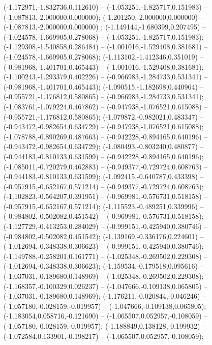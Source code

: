  (-1.172971,-1.832736,0.112610) -- (-1.053251,-1.825717,0.151983) -- (-1.087813,-2.000000,0.000000);
 (-1.201250,-2.000000,0.000000) -- (-1.087813,-2.000000,0.000000) ;
 (-1.149144,-1.680399,0.207495) -- (-1.024578,-1.669905,0.278068) -- (-1.053251,-1.825717,0.151983);
 (-1.129308,-1.540858,0.286484) -- (-1.001016,-1.529408,0.381681) -- (-1.024578,-1.669905,0.278068);
 (-1.113102,-1.412346,0.351019) -- (-0.981968,-1.401701,0.465443) -- (-1.001016,-1.529408,0.381681);
 (-1.100243,-1.293379,0.402226) -- (-0.966983,-1.284733,0.531341) -- (-0.981968,-1.401701,0.465443);
 (-1.090515,-1.182698,0.440964) -- (-0.955721,-1.176812,0.580865) -- (-0.966983,-1.284733,0.531341);
 (-1.083761,-1.079224,0.467862) -- (-0.947938,-1.076521,0.615088) -- (-0.955721,-1.176812,0.580865);
 (-1.079872,-0.982021,0.483347) -- (-0.943472,-0.982654,0.634729) -- (-0.947938,-1.076521,0.615088);
 (-1.078788,-0.890269,0.487663) -- (-0.942228,-0.894165,0.640196) -- (-0.943472,-0.982654,0.634729);
 (-1.080493,-0.803240,0.480877) -- (-0.944183,-0.810133,0.631599) -- (-0.942228,-0.894165,0.640196);
 (-1.085011,-0.720279,0.462883) -- (-0.949377,-0.729724,0.608763) -- (-0.944183,-0.810133,0.631599);
 (-1.092415,-0.640787,0.433398) -- (-0.957915,-0.652167,0.571214) -- (-0.949377,-0.729724,0.608763);
 (-1.102823,-0.564207,0.391951) -- (-0.969981,-0.576731,0.518158) -- (-0.957915,-0.652167,0.571214);
 (-1.115523,-0.489251,0.339996) -- (-0.984802,-0.502082,0.451542) -- (-0.969981,-0.576731,0.518158);
 (-1.127729,-0.413253,0.284029) -- (-0.999151,-0.425940,0.380746) -- (-0.984802,-0.502082,0.451542);
 (-1.139169,-0.336176,0.224601) -- (-1.012694,-0.348338,0.306623) -- (-0.999151,-0.425940,0.380746);
 (-1.149788,-0.258201,0.161771) -- (-1.025348,-0.269502,0.229308) -- (-1.012694,-0.348338,0.306623);
 (-1.159534,-0.179518,0.095616) -- (-1.037031,-0.189680,0.148969) -- (-1.025348,-0.269502,0.229308);
 (-1.168357,-0.100329,0.026237) -- (-1.047666,-0.109138,0.065805) -- (-1.037031,-0.189680,0.148969);
 (-1.176211,-0.020844,-0.046246) -- (-1.057180,-0.028159,-0.019957) -- (-1.047666,-0.109138,0.065805);
 (-1.183054,0.058716,-0.121690) -- (-1.065507,0.052957,-0.108059) -- (-1.057180,-0.028159,-0.019957);
 (-1.188849,0.138128,-0.199932) -- (-1.072584,0.133901,-0.198217) -- (-1.065507,0.052957,-0.108059);
